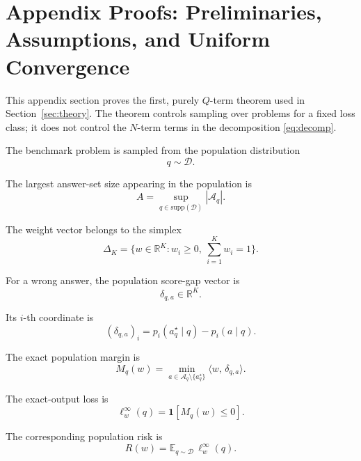 \documentclass{article} %
\providecommand{\D}{\mathcal{D}}
\providecommand{\Aq}{\mathcal{A}_q}
\providecommand{\simplex}{\Delta_K}
\providecommand{\Risk}{R}
\providecommand{\ip}[2]{\langle #1,\, #2\rangle}
\begin{document}
\appendix


\section{Appendix Proofs: Preliminaries, Assumptions, and Uniform Convergence}
\label{app:proofs-uc}

This appendix section proves the first, purely \(Q\)-term theorem used in
Section~\ref{sec:theory}. The theorem controls sampling over problems for a fixed
loss class; it does not control the \(N\)-term terms in the decomposition
\eqref{eq:decomp}.

The benchmark problem is sampled from the population distribution
\begin{equation}
\label{eq:app-qdraw}
q \sim \D .
\end{equation}

The largest answer-set size appearing in the population is
\begin{equation}
\label{eq:app-A}
A = \sup_{q\in \mathrm{supp}(\D)} |\Aq| .
\end{equation}

The weight vector belongs to the simplex
\begin{equation}
\label{eq:app-simplex}
\simplex = \Big\{w\in\mathbb{R}^{K}: w_i\ge 0,\ \sum_{i=1}^{K} w_i=1\Big\}.
\end{equation}

For a wrong answer, the population score-gap vector is
\begin{equation}
\label{eq:app-delta}
\delta_{q,a}\in\mathbb{R}^{K}.
\end{equation}

Its \(i\)-th coordinate is
\begin{equation}
\label{eq:app-delta-coordinate}
(\delta_{q,a})_i
=
p_i(a_q^\star\mid q)-p_i(a\mid q).
\end{equation}

The exact population margin is
\begin{equation}
\label{eq:app-margin}
M_q(w)
=
\min_{a\in \Aq\setminus\{a_q^\star\}}
\ip{w}{\delta_{q,a}} .
\end{equation}

The exact-output loss is
\begin{equation}
\label{eq:app-loss-exact}
\ell_w^\infty(q)
=
\mathbf 1\!\left[M_q(w)\le 0\right].
\end{equation}

The corresponding population risk is
\begin{equation}
\label{eq:app-risk-exact}
\Risk(w)
=
\mathbb{E}_{q\sim \D}\,\ell_w^\infty(q).
\end{equation}
\end{document}
